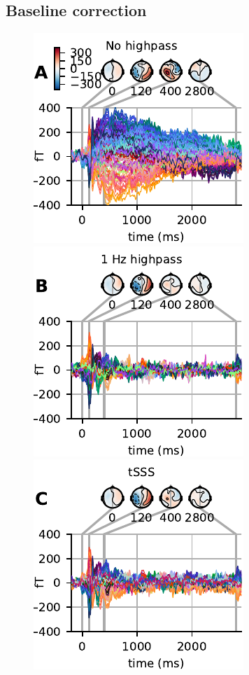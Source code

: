    
\subsection{Baseline correction}
\label{sec:baseline}

\begin{figure}[t]
  \centering
  \includegraphics{figures/FanningA.pdf}
  \hspace{1em}
  \includegraphics{figures/FanningB.pdf}
  \hspace{1em}
  \includegraphics{figures/FanningC.pdf}

\end{figure}
